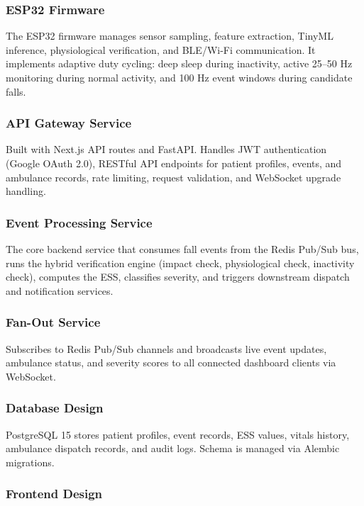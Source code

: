 \subsubsection{ESP32 Firmware}

The ESP32 firmware manages sensor sampling, feature extraction, TinyML inference, physiological verification, and BLE/Wi-Fi communication. It implements adaptive duty cycling: deep sleep during inactivity, active 25--50 Hz monitoring during normal activity, and 100 Hz event windows during candidate falls.

\subsubsection{API Gateway Service}

Built with Next.js API routes and FastAPI. Handles JWT authentication (Google OAuth 2.0), RESTful API endpoints for patient profiles, events, and ambulance records, rate limiting, request validation, and WebSocket upgrade handling.

\subsubsection{Event Processing Service}

The core backend service that consumes fall events from the Redis Pub/Sub bus, runs the hybrid verification engine (impact check, physiological check, inactivity check), computes the ESS, classifies severity, and triggers downstream dispatch and notification services.

\subsubsection{Fan-Out Service}

Subscribes to Redis Pub/Sub channels and broadcasts live event updates, ambulance status, and severity scores to all connected dashboard clients via WebSocket.

\subsubsection{Database Design}

PostgreSQL 15 stores patient profiles, event records, ESS values, vitals history, ambulance dispatch records, and audit logs. Schema is managed via Alembic migrations.

\subsubsection{Frontend Design}

